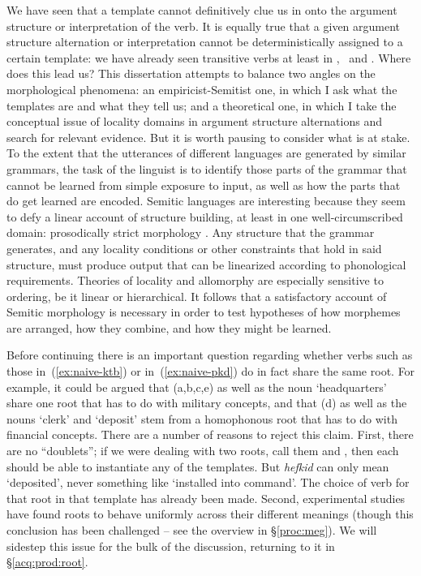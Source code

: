 We have seen that a template cannot definitively clue us in onto the argument structure or interpretation of the verb. It is equally true that a given argument structure alternation or interpretation cannot be deterministically assigned to a certain template: we have already seen transitive verbs at least in \tkal, \tpie~and \thif. Where does this lead us? This dissertation attempts to balance two angles on the morphological phenomena: an empiricist-Semitist one, in which I ask what the templates are and what they tell us; and a theoretical one, in which I take {the} conceptual issue {of locality domains in argument structure alternations} and search for relevant evidence. But it is worth pausing to consider what is at stake. To the extent that the utterances of different languages are generated by similar grammars, the task of the linguist is to identify those parts of the grammar that cannot be learned from simple exposure to input, as well as how the parts that do get learned are encoded. Semitic languages are interesting because they seem to defy a linear account of structure building, at least in one well-circumscribed domain: prosodically strict morphology \citep{jjmcc81}. Any structure that the grammar generates, and any locality conditions or other constraints that hold in said structure, must produce output that can be linearized according to phonological requirements. Theories of locality and allomorphy are especially sensitive to ordering, be it linear or hierarchical. It follows that a satisfactory account of Semitic morphology is necessary in order to test hypotheses of how morphemes are arranged, how they combine, and how they might be learned.

Before continuing there is an important question regarding whether verbs such as those in~(\ref{ex:naive-ktb}) or in~(\ref{ex:naive-pkd}) do in fact share the same root. For example, it could be argued that (\lastx a,b,c,e) as well as the noun `headquarters' share one root that has to do with military concepts, and that (\lastx d) as well as the nouns `clerk' and `deposit' stem from a homophonous root that has to do with financial concepts. There are a number of reasons to reject this claim. First, there are no ``doublets''; if we were dealing with two roots, call them  and , then each should be able to instantiate any of the templates. But \emph{hefkid} can only mean `deposited', never something like `installed into command'. The choice of verb for that root in that template has already been made. Second, experimental {studies} have found roots to behave uniformly across their different meanings (though this conclusion has been challenged{ -- see the overview in \S\ref{proc:meg}}). We will sidestep this issue for the bulk of the discussion, returning to it in \S\ref{acq:prod:root}.

